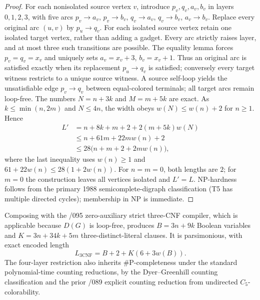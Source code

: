 \documentclass[11pt]{article}
\begin{document}
\begin{proof}
For each nonisolated source vertex $v$, introduce
$p_v,q_v,a_v,b_v$ in layers $0,1,2,3$, with five arcs
$p_v\to a_v$, $p_v\to b_v$, $q_v\to a_v$, $q_v\to b_v$,
$a_v\to b_v$.  Replace every original arc $(u,v)$ by
$p_u\to q_v$.  For each isolated source vertex retain one
isolated target vertex, rather than adding a gadget.
Every arc strictly raises layer, and at most three such transitions
are possible.  The equality lemma forces $p_v=q_v=x_v$ and uniquely
sets $a_v=x_v+3$, $b_v=x_v+1$.  Thus an original arc is satisfied
exactly when its replacement $p_u\to q_v$ is satisfied; conversely
every target witness restricts to a unique source witness.
A source self-loop yields the unsatisfiable edge $p_v\to q_v$
between equal-colored terminals; all target arcs remain loop-free.
The numbers $N=n+3k$ and $M=m+5k$ are exact.
As $k\le\min(n,2m)$ and $N\le4n$, the width obeys
$w(N)\le w(n)+2$ for $n\ge1$.
Hence
\[
\begin{aligned}
 L'&=n+8k+m+2+2(m+5k)w(N)\\
   &\le n+61m+22mw(n)+2\\
   &\le28\bigl(n+m+2+2mw(n)\bigr),
\end{aligned}
\]
where the last inequality uses $w(n)\ge1$ and
$61+22w(n)\le28(1+2w(n))$.
For $n=m=0$, both lengths are $2$; for $m=0$ the
construction leaves all vertices isolated and $L'=L$.
NP-hardness follows from the primary 1988 semicomplete-digraph
classification (T5 has multiple directed cycles);
membership in NP is immediate.
\end{proof}
\begin{corollary}
Composing with the /095 zero-auxiliary strict three-CNF compiler,
which is applicable because $D(G)$ is loop-free, produces
$B=3n+9k$ Boolean variables and $K=3n+34k+5m$
three-distinct-literal clauses.  It is parsimonious, with
exact encoded length
\[
 L_{\mathrm{3CNF}}=B+2+K(6+3w(B)).
\]
The four-layer restriction also inherits \#P-completeness
under the standard polynomial-time counting reductions, by the
Dyer--Greenhill counting classification and the prior /089
explicit counting reduction from undirected $C_5$-colorability.
\end{corollary}
\end{document}

